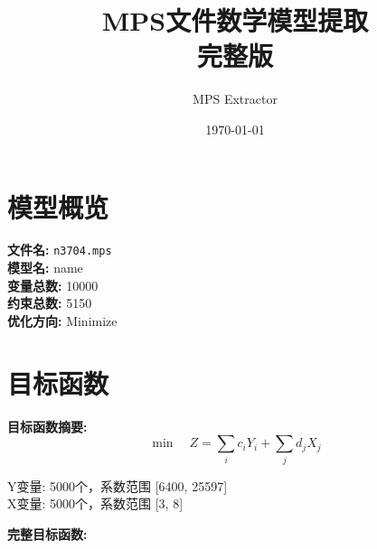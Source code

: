 \documentclass[a4paper,10pt]{article}
\title{MPS文件数学模型提取\\{\large 完整版}}
\author{MPS Extractor}
\date{\today}
\begin{document}
\maketitle
\tableofcontents
\newpage

\section{模型概览}

\textbf{文件名:} \texttt{n3704.mps} \\
\textbf{模型名:} name \\
\textbf{变量总数:} 10000 \\
\textbf{约束总数:} 5150 \\
\textbf{优化方向:} Minimize \\

\section{目标函数}

\textbf{目标函数摘要:}
\begin{equation}
\min \quad Z = \sum_{i} c_i Y_i + \sum_{j} d_j X_j
\end{equation}

Y变量: 5000个，系数范围 [6400, 25597] \\
X变量: 5000个，系数范围 [3, 8]

\textbf{完整目标函数:}
\end{document}
